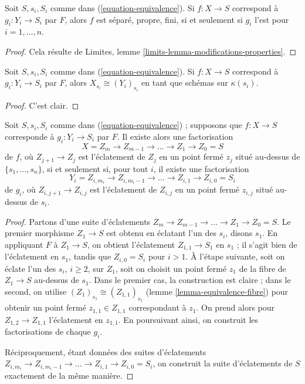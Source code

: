 \begin{lemma} \label{lemma-equivalence-properties} Soit $S, s_i, S_i$ comme dans (\ref{equation-equivalence}). Si $f : X \to S$ correspond à $g_i : Y_i \to S_i$ par $F$, alors $f$ est séparé, propre, fini, si et seulement si $g_i$ l'est pour $i = 1, \ldots, n$. \end{lemma}

\begin{proof} Cela résulte de Limites, lemme \ref{limits-lemma-modifications-properties}. \end{proof}

\begin{lemma} \label{lemma-equivalence-fibre} Soit $S, s_i, S_i$ comme dans (\ref{equation-equivalence}). Si $f : X \to S$ correspond à $g_i : Y_i \to S_i$ par $F$, alors $X_{s_i} \cong (Y_i)_{s_i}$ en tant que schémas sur $\kappa(s_i)$. \end{lemma}

\begin{proof} C'est clair. \end{proof}

\begin{lemma} \label{lemma-equivalence-sequence-blowups} Soit $S, s_i, S_i$ comme dans (\ref{equation-equivalence}) ; supposons que $f : X \to S$ corresponde à $g_i : Y_i \to S_i$ par $F$. Il existe alors une factorisation $$
X = Z_m \to Z_{m - 1} \to \ldots \to Z_1 \to Z_0 = S
$$ de $f$, où $Z_{j + 1} \to Z_j$ est l'éclatement de $Z_j$ en un point fermé $z_j$ situé au-dessus de $\{s_1, \ldots, s_n\}$, si et seulement si, pour tout $i$, il existe une factorisation $$
Y_i = Z_{i, m_i} \to Z_{i, m_i - 1} \to \ldots \to Z_{i, 1} \to Z_{i, 0} = S_i
$$ de $g_i$, où $Z_{i, j + 1} \to Z_{i, j}$ est l'éclatement de $Z_{i, j}$ en un point fermé $z_{i, j}$ situé au-dessus de $s_i$. \end{lemma}

\begin{proof} Partons d'une suite d'éclatements $Z_m \to Z_{m - 1} \to \ldots \to Z_1 \to Z_0 = S$. Le premier morphisme $Z_1 \to S$ est obtenu en éclatant l'un des $s_i$, disons $s_1$. En appliquant $F$ à $Z_1 \to S$, on obtient l'éclatement $Z_{1, 1} \to S_1$ en $s_1$ ; il s'agit bien de l'éclatement en $s_1$, tandis que $Z_{i, 0} = S_i$ pour $i > 1$. À l'étape suivante, soit on éclate l'un des $s_i$, $i \geq 2$, sur $Z_1$, soit on choisit un point fermé $z_1$ de la fibre de $Z_1 \to S$ au-dessus de $s_1$. Dans le premier cas, la construction est claire ; dans le second, on utilise $(Z_1)_{s_1} \cong (Z_{1, 1})_{s_1}$ (lemme \ref{lemma-equivalence-fibre}) pour obtenir un point fermé $z_{1, 1} \in Z_{1, 1}$ correspondant à $z_1$. On prend alors pour $Z_{1, 2} \to Z_{1, 1}$ l'éclatement en $z_{1, 1}$. En poursuivant ainsi, on construit les factorisations de chaque $g_i$.

\medskip\noindent Réciproquement, étant données des suites d'éclatements $Z_{i, m_i} \to Z_{i, m_i - 1} \to \ldots \to Z_{i, 1} \to Z_{i, 0} = S_i$, on construit la suite d'éclatements de $S$ exactement de la même manière. \end{proof}

